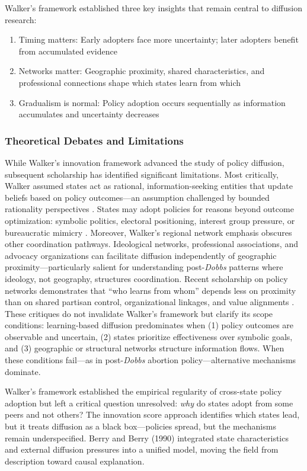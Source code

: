 Walker's framework established three key insights that remain central to diffusion research:
\begin{enumerate}
\item Timing matters: Early adopters face more uncertainty; later adopters benefit from accumulated evidence
\item Networks matter: Geographic proximity, shared characteristics, and professional connections shape which states learn from which
\item Gradualism is normal: Policy adoption occurs sequentially as information accumulates and uncertainty decreases
\end{enumerate}

\subsubsection{Theoretical Debates and Limitations}
While Walker's innovation framework advanced the study of policy diffusion, subsequent scholarship has identified significant limitations. Most critically, Walker assumed states act as rational, information-seeking entities that update beliefs based on policy outcomes---an assumption challenged by bounded rationality perspectives \textcite{Simon1955,Simon1991}. States may adopt policies for reasons beyond outcome optimization: symbolic politics, electoral positioning, interest group pressure, or bureaucratic mimicry \parencite{dimaggioIronCageRevisited1983}.
Moreover, Walker's regional network emphasis obscures other coordination pathways. Ideological networks, professional associations, and advocacy organizations can facilitate diffusion independently of geographic proximity---particularly salient for understanding post-\emph{Dobbs} patterns where ideology, not geography, structures coordination. Recent scholarship on policy networks demonstrates that ``who learns from whom'' depends less on proximity than on shared partisan control, organizational linkages, and value alignments \parencite{desmaraisPersistentPolicyPathways2015}.
These critiques do not invalidate Walker's framework but clarify its scope conditions: learning-based diffusion predominates when (1) policy outcomes are observable and uncertain, (2) states prioritize effectiveness over symbolic goals, and (3) geographic or structural networks structure information flows. When these conditions fail---as in post-\emph{Dobbs} abortion policy---alternative mechanisms dominate.

Walker's framework established the empirical regularity of cross-state policy adoption but left a critical question unresolved: \textit{why} do states adopt from some peers and not others? The innovation score approach identifies which states lead, but it treats diffusion as a black box---policies spread, but the mechanisms remain underspecified. Berry and Berry (1990) integrated state characteristics and external diffusion pressures into a unified model, moving the field from description toward causal explanation.

